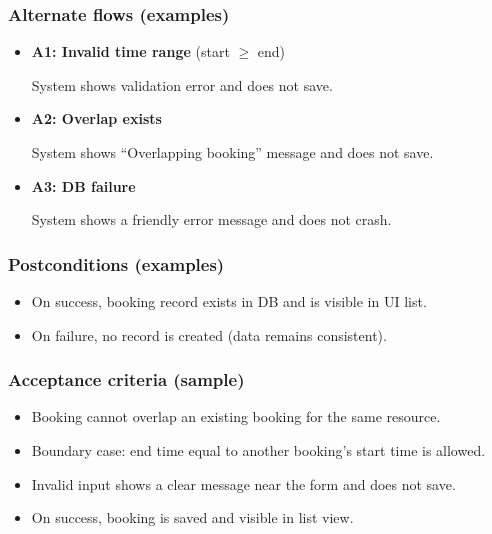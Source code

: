 \documentclass[11pt]{article}
\begin{document}
\subsubsection*{Alternate flows (examples)}
\begin{itemize}
  \item \textbf{A1: Invalid time range} (start $\ge$ end)\par
  System shows validation error and does not save.

  \item \textbf{A2: Overlap exists}\par
  System shows ``Overlapping booking'' message and does not save.

  \item \textbf{A3: DB failure}\par
  System shows a friendly error message and does not crash.
\end{itemize}

\subsubsection*{Postconditions (examples)}
\begin{itemize}
  \item On success, booking record exists in DB and is visible in UI list.
  \item On failure, no record is created (data remains consistent).
\end{itemize}

\subsubsection*{Acceptance criteria (sample)}
\begin{itemize}
  \item Booking cannot overlap an existing booking for the same resource.
  \item Boundary case: end time equal to another booking's start time is allowed.
  \item Invalid input shows a clear message near the form and does not save.
  \item On success, booking is saved and visible in list view.
\end{itemize}
\end{document}
